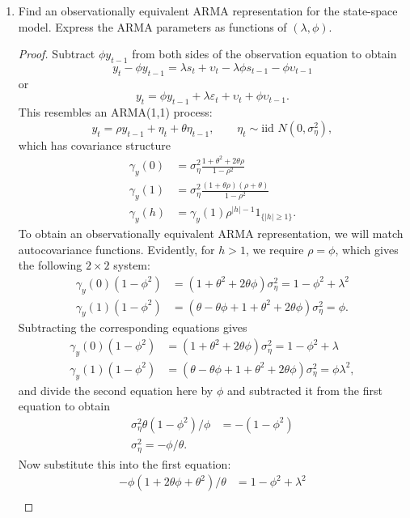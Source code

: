 \documentclass[oneside,reqno]{amsart}
\newcommand{\eps}{\varepsilon}
\newcommand{\ups}{\upsilon}
\theoremstyle{definition}
\begin{document}
\begin{enumerate}
\item
Find an observationally equivalent ARMA representation for the state-space model. Express the ARMA parameters as functions of $(\lambda, \phi)$. 

\begin{proof}
Subtract $\phi y_{t-1}$ from both sides of the observation equation to obtain 
\[
	y_t - \phi y_{t-1} = \lambda s_t + \ups_t - \lambda \phi s_{t-1} - \phi \ups_{t-1} 
\]	
or 
\[
	y_t = \phi y_{t-1} + \lambda \eps_t + \ups_t + \phi \ups_{t-1}.
\]
This resembles an ARMA(1,1) process:
\[
	y_t = \rho y_{t-1} + \eta_t + \theta \eta_{t-1}, 
	\qquad \eta_t  \sim \text{iid } N(0, \sigma_\eta^2),
\]
which has covariance structure 
\begin{align*}
	\gamma_y(0) &= \sigma_\eta^2 \frac{1+\theta^2 + 2 \theta \rho}{1-\rho^2}  \\
	\gamma_y(1) &= \sigma_\eta^2\frac{(1+  \theta \rho)(\rho +\theta)}{1-\rho^2}\\
	\gamma_y(h) &= \gamma_y(1)  \rho^{|h|-1} 1_{\{|h| \geq 1\}}.
\end{align*}
To obtain an observationally equivalent ARMA representation, we will match autocovariance functions. Evidently, for $h>1$, we require $\rho = \phi$, which gives the following $2 \times 2$ system:
\begin{align*}
	\gamma_y(0)(1-\phi^2) &= (1+\theta^2 + 2 \theta \phi) \sigma_\eta^2  = 1-\phi^2 + \lambda^2 \\
	\gamma_y(1)(1-\phi^2) &= (\theta - \theta \phi + 1 + \theta^2 + 2 \theta \phi) \sigma_\eta^2  = \phi.
\end{align*}
Subtracting the corresponding equations gives 
\begin{align*}
	\gamma_y(0)(1-\phi^2) &= (1+\theta^2 + 2 \theta \phi) \sigma_\eta^2  = 1-\phi^2+ \lambda \\
	\gamma_y(1)(1-\phi^2) &= (\theta - \theta \phi + 1 + \theta^2 + 2 \theta \phi) \sigma_\eta^2  = \phi \lambda^2,
\end{align*}
and divide the second equation here by $\phi$ and subtracted it from the first equation to obtain 
\begin{align*}
	\sigma_\eta^2\theta(1-\phi^2)/\phi &= - (1-\phi^2) \\
	\sigma_\eta^2 = -\phi/\theta.
\end{align*}
Now substitute this into the first equation:
\begin{align*}
	-\phi(1 + 2 \theta\phi + \theta^2 )/ \theta &= 1 - \phi^2 + \lambda^2 \\

\end{align*}
\end{proof}
\end{enumerate}
\end{document}
